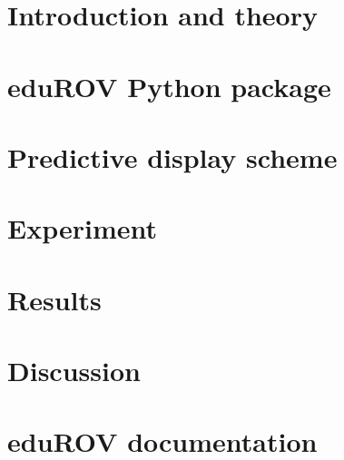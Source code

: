 \documentclass[b5paper,10pt,twoside,openright]{book}
\begin{document}
\newpage\null\thispagestyle{empty}\newpage

\begingroup
\let\cleardoublepage\clearpage






\endgroup
 
{
\tableofcontents

{}
\listoffigures
\cleardoublepage

{}
\listoftables
\cleardoublepage
}
{

\chapter{Introduction and theory} \label{chpIntroduction}
		
	
\chapter{eduROV Python package}\label{chpEdurov}
		
	
\chapter{Predictive display scheme}\label{chpPredictive}
		

\chapter{Experiment}\label{chpMethod}
		

\chapter{Results}\label{chpResults}
	

\chapter{Discussion}\label{chpDiscussion}
	

{
}
\printbibliography
{}

\begin{appendices}\label{appendix}

\chapter*{eduROV documentation}\label{appDoc}



\end{appendices}}
\end{document}
